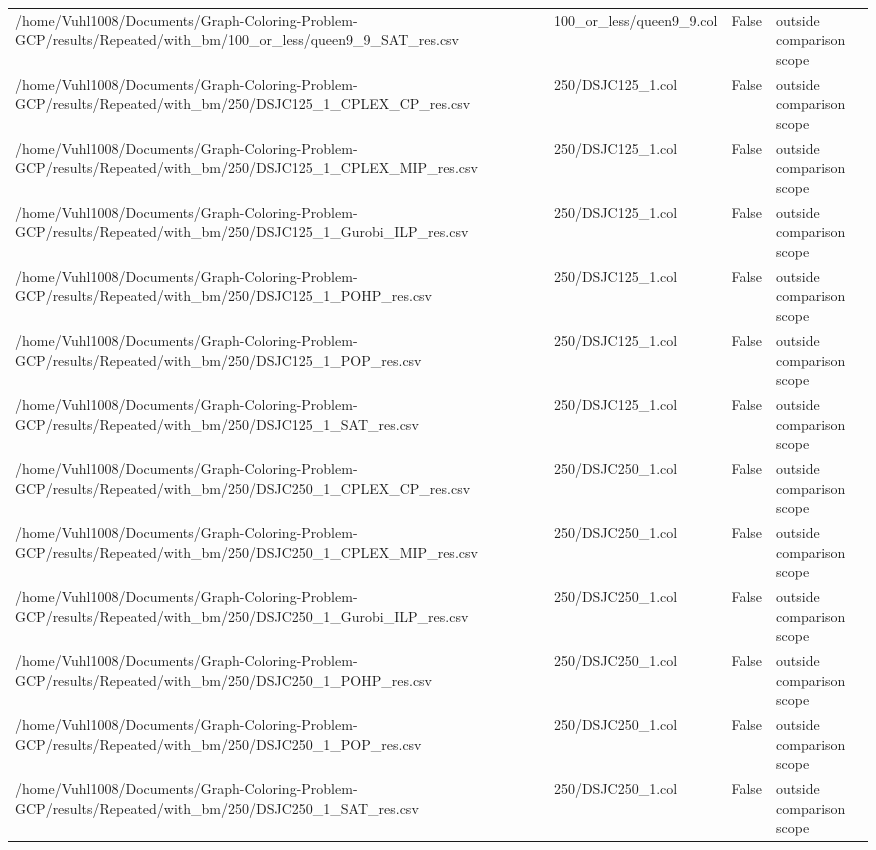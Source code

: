 \begin{table}[htbp]
\begin{tabular}{llll}
/home/Vuhl1008/Documents/Graph-Coloring-Problem-GCP/results/Repeated/with\_bm/100\_or\_less/queen9\_9\_SAT\_res.csv & 100\_or\_less/queen9\_9.col & False & outside comparison scope \\
/home/Vuhl1008/Documents/Graph-Coloring-Problem-GCP/results/Repeated/with\_bm/250/DSJC125\_1\_CPLEX\_CP\_res.csv & 250/DSJC125\_1.col & False & outside comparison scope \\
/home/Vuhl1008/Documents/Graph-Coloring-Problem-GCP/results/Repeated/with\_bm/250/DSJC125\_1\_CPLEX\_MIP\_res.csv & 250/DSJC125\_1.col & False & outside comparison scope \\
/home/Vuhl1008/Documents/Graph-Coloring-Problem-GCP/results/Repeated/with\_bm/250/DSJC125\_1\_Gurobi\_ILP\_res.csv & 250/DSJC125\_1.col & False & outside comparison scope \\
/home/Vuhl1008/Documents/Graph-Coloring-Problem-GCP/results/Repeated/with\_bm/250/DSJC125\_1\_POHP\_res.csv & 250/DSJC125\_1.col & False & outside comparison scope \\
/home/Vuhl1008/Documents/Graph-Coloring-Problem-GCP/results/Repeated/with\_bm/250/DSJC125\_1\_POP\_res.csv & 250/DSJC125\_1.col & False & outside comparison scope \\
/home/Vuhl1008/Documents/Graph-Coloring-Problem-GCP/results/Repeated/with\_bm/250/DSJC125\_1\_SAT\_res.csv & 250/DSJC125\_1.col & False & outside comparison scope \\
/home/Vuhl1008/Documents/Graph-Coloring-Problem-GCP/results/Repeated/with\_bm/250/DSJC250\_1\_CPLEX\_CP\_res.csv & 250/DSJC250\_1.col & False & outside comparison scope \\
/home/Vuhl1008/Documents/Graph-Coloring-Problem-GCP/results/Repeated/with\_bm/250/DSJC250\_1\_CPLEX\_MIP\_res.csv & 250/DSJC250\_1.col & False & outside comparison scope \\
/home/Vuhl1008/Documents/Graph-Coloring-Problem-GCP/results/Repeated/with\_bm/250/DSJC250\_1\_Gurobi\_ILP\_res.csv & 250/DSJC250\_1.col & False & outside comparison scope \\
/home/Vuhl1008/Documents/Graph-Coloring-Problem-GCP/results/Repeated/with\_bm/250/DSJC250\_1\_POHP\_res.csv & 250/DSJC250\_1.col & False & outside comparison scope \\
/home/Vuhl1008/Documents/Graph-Coloring-Problem-GCP/results/Repeated/with\_bm/250/DSJC250\_1\_POP\_res.csv & 250/DSJC250\_1.col & False & outside comparison scope \\
/home/Vuhl1008/Documents/Graph-Coloring-Problem-GCP/results/Repeated/with\_bm/250/DSJC250\_1\_SAT\_res.csv & 250/DSJC250\_1.col & False & outside comparison scope \\

\end{tabular}
\end{table}
